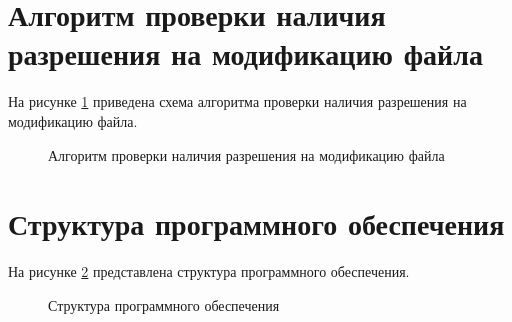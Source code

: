 \section{Алгоритм проверки наличия разрешения на модификацию файла}

На рисунке \ref{fig:init} приведена схема алгоритма проверки наличия разрешения на модификацию файла.

\begin{figure}[ph!]
	\caption{Алгоритм проверки наличия разрешения на модификацию файла}
	\label{fig:init}
\end{figure}

\section{Структура программного обеспечения}

На рисунке \ref{fig:struct} представлена структура программного обеспечения.

\begin{figure}[ph!]
	\caption{Структура программного обеспечения}
	\label{fig:struct}
\end{figure}



